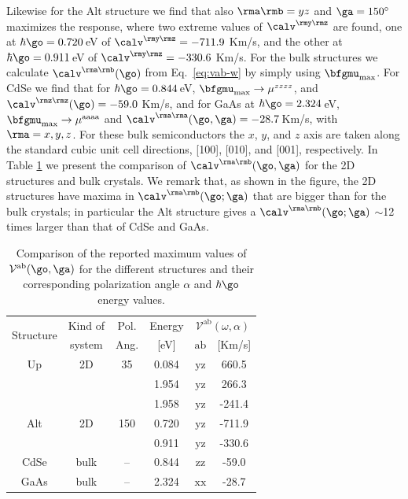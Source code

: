 \documentclass[floatfix,prb,aps,superscriptaddress,showpacs,11pt,preprint,letterpaper]{revtex4}
\begin{document}
Likewise for the Alt structure we find that also $\rma\rmb=yz$ and
$\ga=150^\circ$ maximizes the response, where two extreme values of
$\calv^{\rmy\rmz}$ are found, one at  $\hbar\go=0.720$\,eV of
$\calv^{\rmy\rmz}=-711.9$ Km/s, and the other at $\hbar\go=0.911$\,eV of
$\calv^{\rmy\rmz}=-330.6$ Km/s.
% 
For the bulk structures we calculate $\calv^{\rma\rmb}(\go)$ from
Eq.~\eqref{eq:vab-w} by simply using $\bfgmu_{\mathrm{max}}$. For CdSe we find
that for $\hbar\go=0.844$\,eV, $\bfgmu_{\mathrm{max}}\to \mu^{zzzz}$, and
$\calv^{\rmz\rmz}(\go)=-59.0$ Km/s, and for GaAs at $\hbar\go=2.324$\,eV,
$\bfgmu_{\mathrm{max}}\to\mu^{\mathrm{aaaa}}$ and $\calv^{\rma\rma}(\go,\ga)=-28.7$\,Km/s, with
$\rma=x,y,z$. For these bulk semiconductors the $x$, $y$, and $z$ axis are
taken along the standard cubic unit cell directions, [100], [010], and [001],
respectively. In Table \ref{tab:vab-str-comp} we present the comparison of
$\calv^{\rma\rmb}(\go,\ga)$ for the 2D structures and bulk crystals.
% 
We remark that, as shown in the figure, 
the 2D structures have maxima in 
$\calv^{\rma\rmb}(\go;\ga)$  
that are bigger
than for the bulk crystals; in particular the Alt
structure gives a $\calv^{\rma\rmb}(\go;\ga)$ $\sim$12 times larger than
that of CdSe and GaAs.
\begin{table}%
\begin{tabular}{cccccc}
\hline
\multirow{2}{*}{Structure \quad} & 
Kind of \quad & 
Pol. &
Energy & 
\multicolumn{2}{c}{$\mathcal{V}^{\mathrm{ab}}(\omega,\alpha)$}\\
\cline{5-6}
& system & Ang. & [eV] & $\mathrm{ab}$ \quad & [Km/s]\\
\hline
Up    & 2D   & 35    & 0.084  & $\mathrm{yz}$ &  660.5 \\
      &      &       & 1.954  & $\mathrm{yz}$ &  266.3 \\
      &      &       & 1.958  & $\mathrm{yz}$ & -241.4 \\
Alt   & 2D   & 150   & 0.720  & $\mathrm{yz}$ & -711.9 \\
      &      &       & 0.911  & $\mathrm{yz}$ & -330.6 \\
CdSe  & bulk & --    & 0.844  & $\mathrm{zz}$ &  -59.0 \\
GaAs  & bulk & --    & 2.324  & $\mathrm{xx}$ &  -28.7 \\
\hline
\end{tabular}
\caption{Comparison of the reported maximum values of
$\mathcal{V}^{\mathrm{ab}}(\go,\ga)$ for the different structures and their
corresponding polarization angle $\alpha$ and $\hbar\go$ energy values.
}
\label{tab:vab-str-comp}
\end{table}
\end{document}
